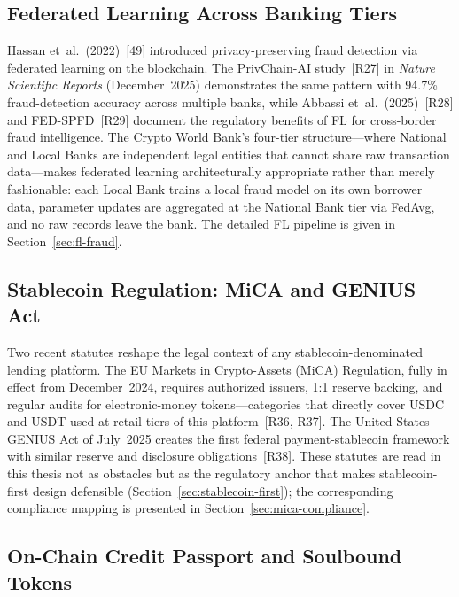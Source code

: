 \documentclass[12pt,a4paper]{report}
\begin{document}
\subsection{Federated Learning Across Banking Tiers}
\label{sec:lit-fl}

Hassan et~al.~(2022)~[49] introduced privacy-preserving fraud detection via federated learning on the blockchain. The PrivChain-AI study~[R27] in \textit{Nature Scientific Reports} (December~2025) demonstrates the same pattern with 94.7\% fraud-detection accuracy across multiple banks, while Abbassi et~al.~(2025)~[R28] and FED-SPFD~[R29] document the regulatory benefits of FL for cross-border fraud intelligence. The Crypto World Bank's four-tier structure---where National and Local Banks are independent legal entities that cannot share raw transaction data---makes federated learning architecturally appropriate rather than merely fashionable: each Local Bank trains a local fraud model on its own borrower data, parameter updates are aggregated at the National Bank tier via FedAvg, and no raw records leave the bank. The detailed FL pipeline is given in Section~\ref{sec:fl-fraud}.

\subsection{Stablecoin Regulation: MiCA and GENIUS Act}
\label{sec:lit-stablecoin-reg}

Two recent statutes reshape the legal context of any stablecoin-denominated lending platform. The EU Markets in Crypto-Assets (MiCA) Regulation, fully in effect from December~2024, requires authorized issuers, 1{:}1 reserve backing, and regular audits for electronic-money tokens---categories that directly cover USDC and USDT used at retail tiers of this platform~[R36, R37]. The United States GENIUS Act of July~2025 creates the first federal payment-stablecoin framework with similar reserve and disclosure obligations~[R38]. These statutes are read in this thesis not as obstacles but as the regulatory anchor that makes stablecoin-first design defensible (Section~\ref{sec:stablecoin-first}); the corresponding compliance mapping is presented in Section~\ref{sec:mica-compliance}.

\subsection{On-Chain Credit Passport and Soulbound Tokens}
\label{sec:lit-sbt}
\end{document}

